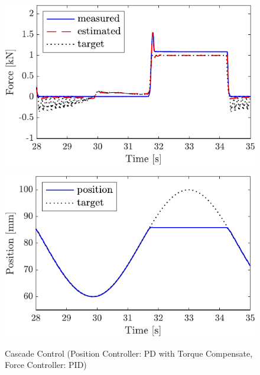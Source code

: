 \begin{figure}[t]
    \begin{minipage}{\minipageratio\hsize}
    \centering
        \includegraphics[keepaspectratio, scale = \minifigscale]{contents/IntegrationControl/figure/SECASQ/crop-FBcsqtch_PID_trq_force.pdf}
        \label{fig5:crop-FBcsqtch_PID_trq_force}
    \end{minipage}
    \begin{minipage}{\minipageratio\hsize}
    \centering
        \includegraphics[keepaspectratio, scale = \minifigscale]{contents/IntegrationControl/figure/SECASQ/crop-FBcsqtch_PID_trq_pos.pdf}
        \label{fig5:crop-FBcsqtch_PID_trq_pos}
    \end{minipage}
    \caption{Cascade Control (Position Controller: PD with Torque Compensate, Force Controller: PID)}  
    \label{fig5:crop-FBcsqtch_PID_trq}
\end{figure}

